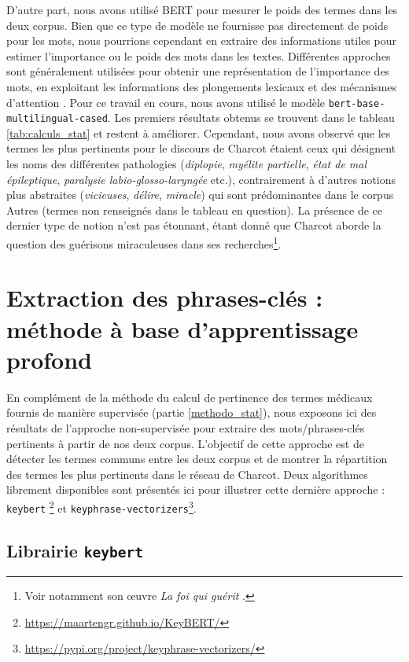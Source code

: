 D'autre part, nous avons utilisé \textsc{BERT} pour mesurer le poids des termes dans les deux corpus. Bien que ce type de modèle ne fournisse pas directement de poids pour les mots, nous pourrions cependant en extraire des informations utiles pour estimer l'importance ou le poids des mots dans les textes. Différentes approches sont généralement utilisées pour obtenir une représentation de l'importance des mots, en exploitant les informations des plongements lexicaux et des mécanismes d'attention \citep{vaswani2023}. Pour ce travail en cours, nous avons utilisé le modèle \texttt{bert-base-multilingual-cased}. Les premiers résultats obtenus se trouvent dans le tableau \ref{tab:calculs_stat} et restent à améliorer. Cependant, nous avons observé que les termes les plus pertinents pour le discours de Charcot étaient ceux qui désignent les noms des différentes pathologies (\textit{diplopie}, \textit{myélite partielle}, \textit{état de mal épileptique}, \textit{paralysie labio-glosso-laryngée} etc.), contrairement à d'autres notions plus abstraites (\textit{vicieuses}, \textit{délire}, \textit{miracle}) qui sont prédominantes dans le corpus
\og{}Autres\fg{} (termes non renseignés dans le tableau en question). La présence de ce dernier type de notion n'est pas étonnant, étant donné que Charcot aborde la question des guérisons miraculeuses dans ses recherches\footnote{Voir notamment son \oe{}uvre \textit{La foi qui guérit} \citep{charcot1897foi}.}. 

\section{Extraction des phrases-clés : méthode à base d'apprentissage profond}
En complément de la méthode du calcul de pertinence des termes médicaux fournis de manière supervisée (partie \ref{methodo_stat}), nous exposons ici des résultats de l'approche non-supervisée pour extraire des mots/phrases-clés  pertinents à partir de nos deux corpus. L'objectif de cette approche est de détecter les termes communs entre les deux corpus et de montrer la répartition des termes les plus pertinents dans le réseau de Charcot. Deux algorithmes librement disponibles sont présentés ici pour illustrer cette dernière approche : \texttt{keybert} \citep{grootendorst2023}\footnote{\url{https://maartengr.github.io/KeyBERT/}} et \texttt{keyphrase-vectorizers}\footnote{\url{https://pypi.org/project/keyphrase-vectorizers/}}.  

\subsection{Librairie \texttt{keybert}}

